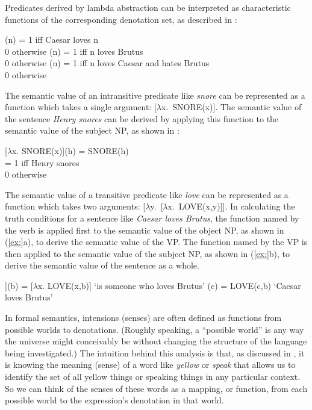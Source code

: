 Predicates derived by lambda abstraction can be interpreted as characteristic functions of the corresponding denotation set, as described in :


\ea {}(n) =  1 iff Caesar loves n\\
  0 otherwise
(n) =  1 iff n loves Brutus\\
  0 otherwise
(n) =  1 iff n loves Caesar and hates Brutus\\
  0 otherwise
\z \z


The semantic value of an intransitive predicate like \textit{snore} can be represented as a function which takes a single argument: [$\lambda $x.~SNORE(x)]. The semantic value of the sentence \textit{Henry snores} can be derived by applying this function to the semantic value of the subject NP, as shown in :


\ea
{}[$\lambda $x. SNORE(x)](h)  =  SNORE(h)\\
  =  1 iff Henry snores\\
    0 otherwise
\z


The semantic value of a transitive predicate like \textit{love} can be represented as a function which takes two arguments: [$\lambda $y.~[$\lambda $x.~LOVE(x,y)]]. In calculating the truth conditions for a sentence like \textit{Caesar loves Brutus}, the function named by the verb is applied first to the semantic value of the object NP, as shown in (\ref{ex:}a), to derive the semantic value of the VP. The function named by the VP is then applied to the semantic value of the subject NP, as shown in (\ref{ex:}b), to derive the semantic value of the sentence as a whole.


\ea
\ea  [$\lambda $y. [$\lambda $x. LOVE(x,y)]](b) = [$\lambda $x. LOVE(x,b)] ‘is someone who loves Brutus’
(c) =  LOVE(c,b) ‘Caesar loves Brutus’
\z \z


In formal semantics, intensions (senses) are often defined as functions from possible worlds to denotations. (Roughly speaking, a “possible world” is any way the universe might conceivably be without changing the structure of the language being investigated.) The intuition behind this analysis is that, as discussed in , it is knowing the meaning (sense) of a word like \textit{yellow} or \textit{speak} that allows us to identify the set of all yellow things or speaking things in any particular context. So we can think of the senses of these words as a mapping, or function, from each possible world to the expression’s denotation in that world.



